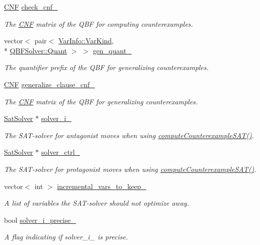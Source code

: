 \begin{DoxyCompactItemize}
\hyperlink{classCNF}{C\-N\-F} \hyperlink{classLearnSynthQBF_afe20b32b1b8c07a237322825c91a36f0}{check\-\_\-cnf\-\_\-}
\begin{DoxyCompactList}\small\item\em The \hyperlink{classCNF}{C\-N\-F} matrix of the Q\-B\-F for computing counterexamples. \end{DoxyCompactList}\item 
vector$<$ pair$<$ \hyperlink{classVarInfo_a64d1da76cf84fe674e5fef9764ef11cf}{Var\-Info\-::\-Var\-Kind}, \\*
\hyperlink{classQBFSolver_ac091e263cb55286cc07b2451bcf4d3c7}{Q\-B\-F\-Solver\-::\-Quant} $>$ $>$ \hyperlink{classLearnSynthQBF_a2a6687cca6f45b9684d3bd6e7cc8c20c}{gen\-\_\-quant\-\_\-}
\begin{DoxyCompactList}\small\item\em The quantifier prefix of the Q\-B\-F for generalizing counterexamples. \end{DoxyCompactList}\item 
\hyperlink{classCNF}{C\-N\-F} \hyperlink{classLearnSynthQBF_adb0678a7c034958c31bd5d92615e9859}{generalize\-\_\-clause\-\_\-cnf\-\_\-}
\begin{DoxyCompactList}\small\item\em The \hyperlink{classCNF}{C\-N\-F} matrix of the Q\-B\-F for generalizing counterexamples. \end{DoxyCompactList}\item 
\hyperlink{classSatSolver}{Sat\-Solver} $\ast$ \hyperlink{classLearnSynthQBF_ada2e8c87c0ca0d83c484d6181ea5a788}{solver\-\_\-i\-\_\-}
\begin{DoxyCompactList}\small\item\em The S\-A\-T-\/solver for antagonist moves when using \hyperlink{classLearnSynthQBF_a3221800bf3f040b66b8a790bab4c82b5}{compute\-Counterexample\-S\-A\-T()}. \end{DoxyCompactList}\item 
\hyperlink{classSatSolver}{Sat\-Solver} $\ast$ \hyperlink{classLearnSynthQBF_a14f20d46129ad1fe2db8272348a7e589}{solver\-\_\-ctrl\-\_\-}
\begin{DoxyCompactList}\small\item\em The S\-A\-T-\/solver for protagonist moves when using \hyperlink{classLearnSynthQBF_a3221800bf3f040b66b8a790bab4c82b5}{compute\-Counterexample\-S\-A\-T()}. \end{DoxyCompactList}\item 
vector$<$ int $>$ \hyperlink{classLearnSynthQBF_a227ff215ffb411e57686aa3d8e7f7026}{incremental\-\_\-vars\-\_\-to\-\_\-keep\-\_\-}
\begin{DoxyCompactList}\small\item\em A list of variables the S\-A\-T-\/solver should not optimize away. \end{DoxyCompactList}\item 
bool \hyperlink{classLearnSynthQBF_ae65774a2b9e6137d6ff45cbf755d4843}{solver\-\_\-i\-\_\-precise\-\_\-}
\begin{DoxyCompactList}\small\item\em A flag indicating if solver\-\_\-i\-\_\- is precise. \end{DoxyCompactList}\end{DoxyCompactItemize}
